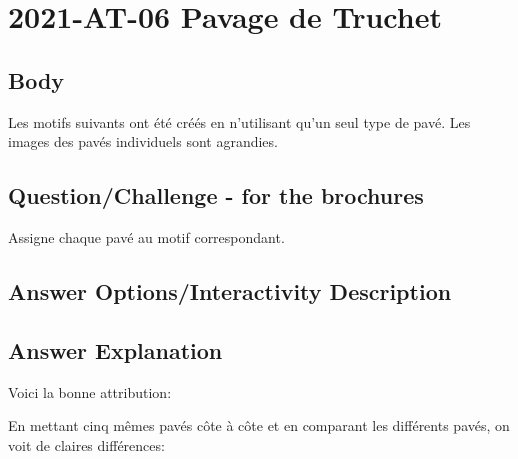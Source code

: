\documentclass[a4paper,11pt]{report}
\newcommand{\taskGraphicsFolder}{..}
\begin{document}
\section*{\centering{} 2021-AT-06 Pavage de Truchet}


\subsection*{Body}

Les motifs suivants ont été créés en n’utilisant qu’un seul type de pavé. Les images des pavés individuels sont agrandies.

{\em


\subsection*{Question/Challenge - for the brochures}

Assigne chaque pavé au motif correspondant.

{\centering%
\par}

}

\begingroup
\renewcommand{\arraystretch}{1.5}
\subsection*{Answer Options/Interactivity Description}



\endgroup

\subsection*{Answer Explanation}

Voici la bonne attribution:

{\centering%
\par}

En mettant cinq mêmes pavés côte à côte et en comparant les différents pavés, on voit de claires différences:

{\centering%
\par}
\end{document}
